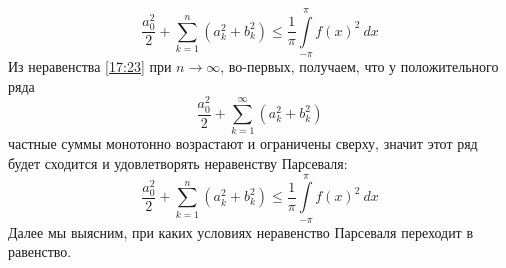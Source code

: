 \documentclass[../../main.tex]{subfiles}
\begin{document}
	\begin{equation}
	\label{17:23}
	\frac{a_0^2}{2} + \sum_{k=1}^{n} \left( a_k^2 + b_k^2\right) \le \frac{1}{\pi}  \int\limits_{-\pi}^{\pi} f(x)^2 \ dx
	\end{equation}
	Из неравенства \eqref{17:23} при $n \to \infty$, во-первых, получаем, что у положительного ряда
	\[  \frac{a_0^2}{2} + \sum_{k=1}^{\infty} \left( a_k^2 + b_k^2  \right)     \]
	частные суммы монотонно возрастают и ограничены сверху, значит этот ряд будет сходится и удовлетворять неравенству Парсеваля: 
	\begin{equation}
	\label{17:24}
	\frac{a_0^2}{2} + \sum_{k=1}^{n} \left( a_k^2 + b_k^2\right) \le \frac{1}{\pi}  \int\limits_{-\pi}^{\pi} f(x)^2 \ dx
	\end{equation}
	Далее мы выясним, при каких условиях неравенство Парсеваля переходит в равенство.
	
\end{document}
